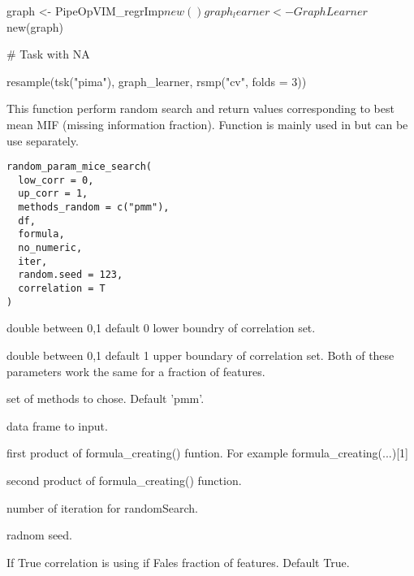 \documentclass[letterpaper]{book}
\begin{document}
%
\begin{Examples}
\begin{ExampleCode}
{
  graph <- PipeOpVIM_regrImp$new() %
  graph_learner <- GraphLearner$new(graph)

  # Task with NA

  resample(tsk("pima"), graph_learner, rsmp("cv", folds = 3))
}
\end{ExampleCode}
\end{Examples}
%
\begin{Description}\relax
This function perform random search and return values corresponding to best mean MIF (missing information fraction). Function is mainly used in  but can be use separately.
\end{Description}
%
\begin{Usage}
\begin{verbatim}
random_param_mice_search(
  low_corr = 0,
  up_corr = 1,
  methods_random = c("pmm"),
  df,
  formula,
  no_numeric,
  iter,
  random.seed = 123,
  correlation = T
)
\end{verbatim}
\end{Usage}
%
\begin{Arguments}
\begin{ldescription}
\item[\code{low\_corr}] double between 0,1 default 0 lower boundry of correlation set.

\item[\code{up\_corr}] double between 0,1 default 1 upper boundary of correlation set. Both of these parameters work the same for a fraction of features.

\item[\code{methods\_random}] set of methods to chose. Default 'pmm'.

\item[\code{df}] data frame to input.

\item[\code{formula}] first product of formula\_creating() funtion. For example formula\_creating(...)[1]

\item[\code{no\_numeric}] second product of formula\_creating() function.

\item[\code{iter}] number of iteration for randomSearch.

\item[\code{random.seed}] radnom seed.

\item[\code{correlation}] If True correlation is using if Fales fraction of features. Default True.
\end{ldescription}
\end{Arguments}
\end{document}
